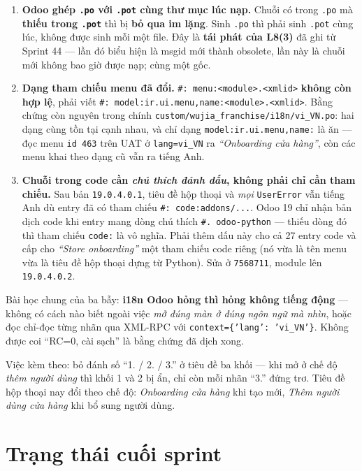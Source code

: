 \begin{enumerate}
\item \textbf{Odoo ghép \texttt{.po} với \texttt{.pot} cùng thư mục lúc nạp.} Chuỗi có trong
  \texttt{.po} mà \textbf{thiếu trong \texttt{.pot}} thì bị \textbf{bỏ qua im lặng}. Sinh
  \texttt{.po} thì phải sinh \texttt{.pot} cùng lúc, không được sinh mỗi một file. Đây là
  \textbf{tái phát của L8(3)} đã ghi từ Sprint 44 --- lần đó biểu hiện là msgid mới thành
  obsolete, lần này là chuỗi mới không bao giờ được nạp; cùng một gốc.
\item \textbf{Dạng tham chiếu menu đã đổi.} \texttt{\#: menu:<module>.<xmlid>} \textbf{không
  còn hợp lệ}, phải viết \texttt{\#: model:ir.ui.menu,name:<module>.<xmlid>}. Bằng chứng còn
  nguyên trong chính \texttt{custom/wujia\_franchise/i18n/vi\_VN.po}: hai dạng cùng tồn tại
  cạnh nhau, và chỉ dạng \texttt{model:ir.ui.menu,name:} là ăn --- đọc menu \texttt{id 463}
  trên UAT ở \texttt{lang=vi\_VN} ra \emph{``Onboarding cửa hàng''}, còn các menu khai theo
  dạng cũ vẫn ra tiếng Anh.
\item \textbf{Chuỗi trong code cần \emph{chú thích đánh dấu}, không phải chỉ cần tham chiếu.}
  Sau bản \texttt{19.0.4.0.1}, tiêu đề hộp thoại và \emph{mọi} \texttt{UserError} vẫn tiếng
  Anh dù entry đã có tham chiếu \texttt{\#: code:addons/...}. Odoo 19 chỉ nhận bản dịch code
  khi entry mang dòng chú thích \texttt{\#. odoo-python} --- thiếu dòng đó thì tham chiếu
  \texttt{code:} là vô nghĩa. Phải thêm dấu này cho cả 27 entry code và cấp cho
  \emph{``Store onboarding''} một tham chiếu code riêng (nó vừa là tên menu vừa là tiêu đề hộp
  thoại dựng từ Python). Sửa ở \texttt{7568711}, module lên \texttt{19.0.4.0.2}.
\end{enumerate}

Bài học chung của ba bẫy: \textbf{i18n Odoo hỏng thì hỏng không tiếng động} --- không có cách
nào biết ngoài việc \emph{mở đúng màn ở đúng ngôn ngữ mà nhìn}, hoặc đọc chỉ-đọc từng nhãn qua
XML-RPC với \texttt{context=\{'lang': 'vi\_VN'\}}. Không được coi ``RC=0, cài sạch'' là bằng
chứng đã dịch xong.

Việc kèm theo: bỏ đánh số ``1. / 2. / 3.'' ở tiêu đề ba khối --- khi mở ở chế độ \emph{thêm
người dùng} thì khối 1 và 2 bị ẩn, chỉ còn mỗi nhãn ``3.'' đứng trơ. Tiêu đề hộp thoại nay đổi
theo chế độ: \emph{Onboarding cửa hàng} khi tạo mới, \emph{Thêm người dùng cửa hàng} khi bổ sung
người dùng.

\section{Trạng thái cuối sprint}


